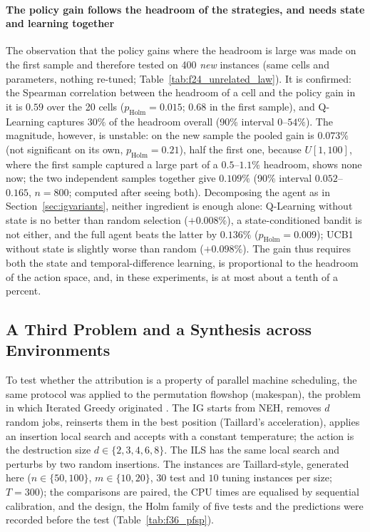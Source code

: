\documentclass[final,3p,times,11pt,authoryear]{elsarticle}
\begin{document}






\paragraph{The policy gain follows the headroom of the strategies, and needs state and learning together}
The observation that the policy gains where the headroom is large was made on the
first sample and therefore tested on 400 \emph{new} instances (same cells and
parameters, nothing re-tuned; Table~\ref{tab:f24_unrelated_law}). It is
confirmed: the Spearman correlation between the headroom of a cell and the
policy gain in it is $0.59$ over the 20 cells ($p_{\mathrm{Holm}}=0.015$; $0.68$ in
the first sample), and Q-Learning captures $30\%$ of the headroom overall
(90\% interval $0$--$54\%$). The magnitude, however, is unstable: on the
new sample the pooled gain is $0.073\%$ (not significant on its own,
$p_{\mathrm{Holm}}=0.21$), half the first one, because $U[1,100]$, where the first
sample captured a large part of a $0.5$--$1.1\%$ headroom, shows none now; the two
independent samples together give $0.109\%$ (90\% interval $0.052$--$0.165$,
$n=800$; computed after seeing both). Decomposing the agent as in
Section~\ref{sec:igvariants}, neither ingredient is enough alone: Q-Learning without
state is no better than random selection ($+0.008\%$), a state-conditioned bandit is
not either, and the full agent beats the latter by $0.136\%$
($p_{\mathrm{Holm}}=0.009$); UCB1 without state is slightly worse than random
($+0.098\%$). The gain thus requires both the state and temporal-difference
learning, is proportional to the headroom of the action space, and, in these
experiments, is at most about a tenth of a percent.




\subsection{A Third Problem and a Synthesis across Environments}
\label{sec:pfsp}

To test whether the attribution is a property of parallel machine scheduling, the same protocol was applied to the permutation flowshop (makespan), the problem in which Iterated Greedy originated \citep{RuizStutzle2007}. The IG starts from NEH, removes $d$ random jobs, reinserts them in the best position (Taillard's acceleration), applies an insertion local search and accepts with a constant temperature; the action is the destruction size $d\in\{2,3,4,6,8\}$. The ILS has the same local search and perturbs by two random insertions. The instances are Taillard-style, generated here ($n\in\{50,100\}$, $m\in\{10,20\}$, $30$ test and $10$ tuning instances per size; $T=300$); the comparisons are paired, the CPU times are equalised by sequential calibration, and the design, the Holm family of five tests and the predictions were recorded before the test (Table~\ref{tab:f36_pfsp}).
\end{document}
